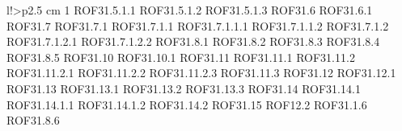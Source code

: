 \begin{tabella}{l!{\VRule}>{\centering\arraybackslash}p{2.5 cm}}
1 \linebreak ROF31.5.1.1 \linebreak ROF31.5.1.2 \linebreak ROF31.5.1.3 \linebreak ROF31.6 \linebreak ROF31.6.1 \linebreak ROF31.7 \linebreak ROF31.7.1 \linebreak ROF31.7.1.1 \linebreak ROF31.7.1.1.1 \linebreak ROF31.7.1.1.2 \linebreak ROF31.7.1.2 \linebreak ROF31.7.1.2.1 \linebreak ROF31.7.1.2.2 \linebreak ROF31.8.1 \linebreak ROF31.8.2 \linebreak ROF31.8.3 \linebreak ROF31.8.4 \linebreak ROF31.8.5 \linebreak ROF31.10 \linebreak ROF31.10.1 \linebreak ROF31.11 \linebreak ROF31.11.1 \linebreak ROF31.11.2 \linebreak ROF31.11.2.1 \linebreak ROF31.11.2.2 \linebreak ROF31.11.2.3 \linebreak ROF31.11.3 \linebreak ROF31.12 \linebreak ROF31.12.1 \linebreak ROF31.13 \linebreak ROF31.13.1 \linebreak ROF31.13.2 \linebreak ROF31.13.3 \linebreak ROF31.14 \linebreak ROF31.14.1 \linebreak ROF31.14.1.1 \linebreak ROF31.14.1.2 \linebreak ROF31.14.2 \linebreak ROF31.15 \linebreak ROF12.2 \linebreak ROF31.1.6 \linebreak ROF31.8.6 \\

\end{tabella}
